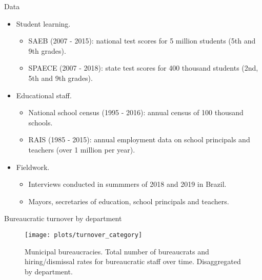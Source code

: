 \documentclass[ignorenonframetext,]{beamer}
\providecommand{\tightlist}{%
  \setlength{\itemsep}{0pt}\setlength{\parskip}{0pt}}
\begin{document}
\begin{frame}{Data}
\protect\hypertarget{data}{}

\begin{itemize}
\tightlist
\item
  Student learning.

  \begin{itemize}
  \tightlist
  \item
    SAEB (2007 - 2015): national test scores for 5 million students (5th
    and 9th grades).
  \item
    SPAECE (2007 - 2018): state test scores for 400 thousand students
    (2nd, 5th and 9th grades).
  \end{itemize}
\item
  Educational staff.

  \begin{itemize}
  \tightlist
  \item
    National school census (1995 - 2016): annual census of 100 thousand
    schools.
  \item
    RAIS (1985 - 2015): annual employment data on school principals and
    teachers (over 1 million per year).
  \end{itemize}
\item
  Fieldwork.

  \begin{itemize}
  \tightlist
  \item
    Interviews conducted in summmers of 2018 and 2019 in Brazil.
  \item
    Mayors, secretaries of education, school principals and teachers.
  \end{itemize}
\end{itemize}

\end{frame}

\begin{frame}{Bureaucratic turnover by department}
\protect\hypertarget{bureaucratic-turnover-by-department}{}

\begin{figure}

{\centering \texttt{[image: plots/turnover\_category]} 

}

\caption{Municipal bureaucracies. Total number of bureaucrats and hiring/dismissal rates for bureaucratic staff over time. Disaggregated by department.}\label{fig:staff}
\end{figure}

\end{frame}
\end{document}
